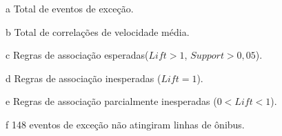 \documentclass[
	12pt,				%
	oneside,			%
	a4paper,			%
	english,			%
	brazil				%
	]{abntex2ppgsi}
\begin{document}
{{{\begin{apendicesenv}
\begin{table}[!htb]
\begin{threeparttable}
\begin{tablenotes}
            \item[a] Total de eventos de exceção.
            \item[b] Total de correlações de velocidade média.
            \item[c] Regras de associação esperadas($Lift > 1$, $Support > 0,05$).
            \item[d] Regras de associação inesperadas ($Lift = 1$).
            \item[e] Regras de associação parcialmente inesperadas ($0 < Lift < 1$).
            \item[f] 148 eventos de exceção não atingiram linhas de ônibus.
        \end{tablenotes}
\end{threeparttable}
\end{table}


\end{apendicesenv}}}}
\end{document}
